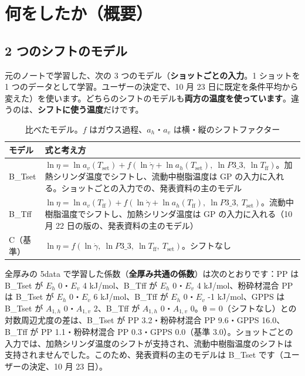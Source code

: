 \documentclass[paper=a4paper,fontsize=10.5pt,line_length=44zw,number_of_lines=38]{jlreq}
\newcommand{\gd}{\dot{\gamma}}
\newcommand{\Tff}{T_{\mathrm{ff}}}
\newcommand{\Tset}{T_{\mathrm{set}}}
\newcommand{\Eh}{E_{h}}
\newcommand{\Ev}{E_{v}}
\newcommand{\PIII}{P3\_3}
\begin{document}
\section{何をしたか（概要）}

\subsection{2 つのシフトのモデル}
元のノートで学習した、次の 3 つのモデル（\textbf{ショットごとの入力}。1 ショットを 1 つのデータとして学習。ユーザーの決定で、10 月 23 日に既定を条件平均から変えた）を使います。どちらのシフトのモデルも\textbf{両方の温度を使っています}。違うのは、\textbf{シフトに使う温度}だけです。
\begin{table}[H]
\caption{比べたモデル。$f$ はガウス過程、$a_h$・$a_v$ は横・縦のシフトファクター}\label{tab:model}
\small
\begin{tabularx}{\linewidth}{@{}l>{\raggedright\arraybackslash}X@{}}
\toprule
モデル & 式と考え方 \\
\midrule
B\_Tset & $\ln\eta=\ln a_v(\Tset)+f(\ln\gd+\ln a_h(\Tset),\ \ln\PIII,\ \ln\Tff)$。加熱シリンダ温度でシフトし、流動中樹脂温度は GP の入力に入れる。ショットごとの入力での、発表資料の主のモデル \\
B\_Tff & $\ln\eta=\ln a_v(\Tff)+f(\ln\gd+\ln a_h(\Tff),\ \ln\PIII,\ \Tset)$。流動中樹脂温度でシフトし、加熱シリンダ温度は GP の入力に入れる（10 月 22 日の版の、発表資料の主のモデル） \\
C（基準） & $\ln\eta=f(\ln\gd,\ \ln\PIII,\ \ln\Tff,\ \Tset)$。シフトなし \\
\bottomrule
\end{tabularx}
\end{table}
全厚みの 5data で学習した係数（\textbf{全厚み共通の係数}）は次のとおりです：PP は B\_Tset が $\Eh$ 0・$\Ev$ 4 kJ/mol、B\_Tff が $\Eh$ 0・$\Ev$ 4 kJ/mol、粉砕材混合 PP は B\_Tset が $\Eh$ 0・$\Ev$ 6 kJ/mol、B\_Tff が $\Eh$ 0・$\Ev$ -1 kJ/mol、GPPS は B\_Tset が $A_{1,h}$ 0・$A_{1,v}$ 2、B\_Tff が $A_{1,h}$ 0・$A_{1,v}$ 0。θ = 0（シフトなし）との対数周辺尤度の差は、B\_Tset が PP 3.2・粉砕材混合 PP 9.6・GPPS 16.0、B\_Tff が PP 1.1・粉砕材混合 PP 0.3・GPPS 0.0（基準 3.0）。ショットごとの入力では、加熱シリンダ温度のシフトが支持され、流動中樹脂温度のシフトは支持されませんでした。このため、発表資料の主のモデルは B\_Tset です（ユーザーの決定、10 月 23 日）。
\end{document}

